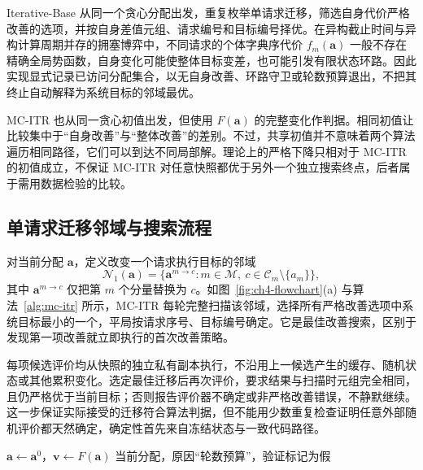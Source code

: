Iterative-Base 从同一个贪心分配出发，重复枚举单请求迁移，筛选自身代价严格改善的选项，并按自身差值元组、请求编号和目标编号择优。在异构截止时间与异构计算周期并存的拥塞博弈中，不同请求的个体字典序代价 $f_m(\mathbf{a})$ 一般不存在精确全局势函数\cite{monderer1996potential,chen2016efficient}，自身变化可能使整体目标变差，也可能引发有限状态环路。因此实现显式记录已访问分配集合，以无自身改善、环路守卫或轮数预算退出，不把其终止自动解释为系统目标的邻域最优。

MC-ITR 也从同一贪心初值出发，但使用 $F(\mathbf a)$ 的完整变化作判据。相同初值让比较集中于“自身改善”与“整体改善”的差别。不过，共享初值并不意味着两个算法遍历相同路径，它们可以到达不同局部解。理论上的严格下降只相对于 MC-ITR 的初值成立，不保证 MC-ITR 对任意快照都优于另外一个独立搜索终点，后者属于需用数据检验的比较。

\subsection{单请求迁移邻域与搜索流程}
\label{sec:ch4-neighborhood}

对当前分配 $\mathbf a$，定义改变一个请求执行目标的邻域
\begin{equation}
 \mathcal N_1(\mathbf a)=
 \{\mathbf a^{m\to c}:m\in\mathcal M,\ c\in\mathcal C_m\setminus\{a_m\}\},
 \label{eq:ch4-one-move-neighborhood}
\end{equation}
其中 $\mathbf a^{m\to c}$ 仅把第 $m$ 个分量替换为 $c$。如图~\ref{fig:ch4-flowchart}(a) 与算法~\ref{alg:mc-itr} 所示，MC-ITR 每轮完整扫描该邻域，选择所有严格改善选项中系统目标最小的一个，平局按请求序号、目标编号确定。它是最佳改善搜索，区别于发现第一项改善就立即执行的首次改善策略。

每项候选评价均从快照的独立私有副本执行，不沿用上一候选产生的缓存、随机状态或其他累积变化。选定最佳迁移后再次评价，要求结果与扫描时元组完全相同，且仍严格优于当前目标；否则报告评价器不确定或非严格改善错误，不静默继续。这一步保证实际接受的迁移符合算法判据，但不能用少数重复检查证明任意外部随机评价都天然确定，确定性首先来自冻结状态与一致代码路径。

\begin{algorithm}[!htbp]
 \caption{MC-ITR：全批次重评估的最佳单请求迁移搜索}
 \label{alg:mc-itr}
 $\mathbf a\leftarrow\mathbf a^0$，$\mathbf v\leftarrow F(\mathbf a)$\;
 \Return 当前分配，原因“轮数预算”，验证标记为假\;
\end{algorithm}

